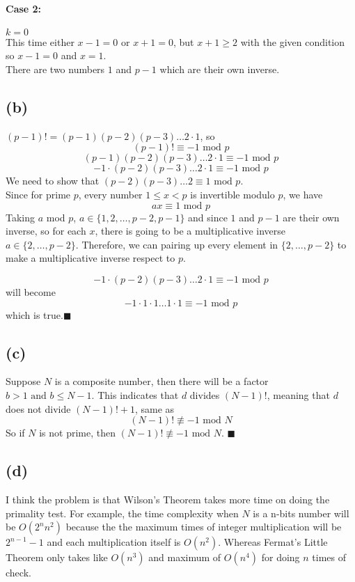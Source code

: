 \documentclass{article}
\begin{document}
\paragraph{Case 2:} $k = 0$\\
This time either $x-1 = 0$ or $x+1 = 0$, but $x+1 \geq 2$ with the given condition so $x - 1 = 0$ and $x= 1$.
\\
There are two numbers $1$ and $p-1$ which are their own inverse.

\subsection*{(b)}
$(p-1)! = (p-1)(p-2)(p-3)\dots 2 \cdot 1$, so
    $$(p-1)! \equiv -1 \mbox{ mod } p$$
    $$(p-1)(p-2)(p-3)\dots 2 \cdot 1 \equiv -1 \mbox{ mod } p$$
    $$-1 \cdot (p-2)(p-3)\dots 2 \cdot 1 \equiv -1 \mbox{ mod } p $$
We need to show that  $(p-2)(p-3) \ldots 2 \equiv 1 \mbox{ mod } p$.\\
Since for prime $p$, every number $1 \leq x < p$ is invertible modulo $p$, we have 
$$ax \equiv 1 \mbox{ mod } p $$
Taking $a$ mod $p$, $a \in \{1,2,\dots, p-2,p-1\}$ and since $1$ and $p-1$ are their own inverse,
so for each $x$, there is going to be a multiplicative inverse $a \in \{2,\dots,p-2\}$. Therefore, we can pairing up every element in $ \{2,\dots,p-2\}$ to make a multiplicative inverse respect to $p$.

$$-1 \cdot (p-2)(p-3)\dots 2 \cdot 1 \equiv -1 \mbox{ mod } p $$
will become
$$-1 \cdot 1 \cdot 1 \dots 1 \cdot 1 \equiv -1 \mbox{ mod } p $$
which is true.$\blacksquare$

\subsection*{(c)}
Suppose $N$ is a composite number, then there will be a factor $b > 1 \mbox{ and } b \leq N-1$. This indicates that $d$ divides $(N-1)!$, meaning that $d$ does not divide $(N-1)! + 1$, same as
$$(N-1)! \not\equiv -1 \mbox{ mod } N$$
So if $N$ is not prime, then  $(N-1)! \not\equiv -1 \mbox{ mod } N$. $\blacksquare$


\subsection*{(d)}
I think the problem is that Wilson's Theorem takes more time on doing the primality test. 
For example, the time complexity when $N$ is a n-bits number will be $O(2^nn^2)$ because the the maximum times of integer multiplication will be $2^{n-1}-1$ and each multiplication itself is $O(n^2)$. Whereas 
Fermat's Little Theorem only takes like $O(n^3)$ and maximum of $O(n^4)$ for doing $n$ times of check.
\end{document}

